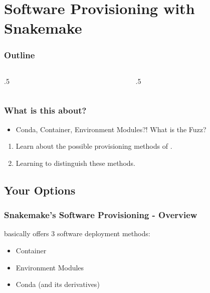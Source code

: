 \section{Software Provisioning with Snakemake}

\ifdefined\ishandout
{
	\frame{
		\tableofcontents[currentsection]
	}
}
\else
\begin{frame}
	\frametitle{Outline}
	\begin{columns}[t]
		\begin{column}{.5\textwidth}
            \tableofcontents[sections={1-7},currentsection]
		\end{column}
		\begin{column}{.5\textwidth}
            \tableofcontents[sections={8-15},currentsection]
		\end{column}
	\end{columns}
\end{frame}
\fi

\begin{frame}
	\frametitle{What is this about?}
	\begin{question}[Questions]
		\begin{itemize}
			\item Conda, Container, Environment Modules?! What is the Fuzz?
		\end{itemize}
	\end{question}
	\begin{docs}[Objectives]
		\begin{enumerate}
			\item Learn about the possible provisioning methods of \Snakemake.
			\item Learning to distinguish these methods.
		\end{enumerate}
	\end{docs}
\end{frame}

\subsection{Your Options}

\begin{frame}
  \frametitle{Snakemake's Software Provisioning - Overview}
  \Snakemake{} basically offers 3 software deployment methods:
  \begin{itemize}[<+->]
    \item Container
    \item Environment Modules
    \item Conda (and its derivatives)
  \end{itemize}
\end{frame}

